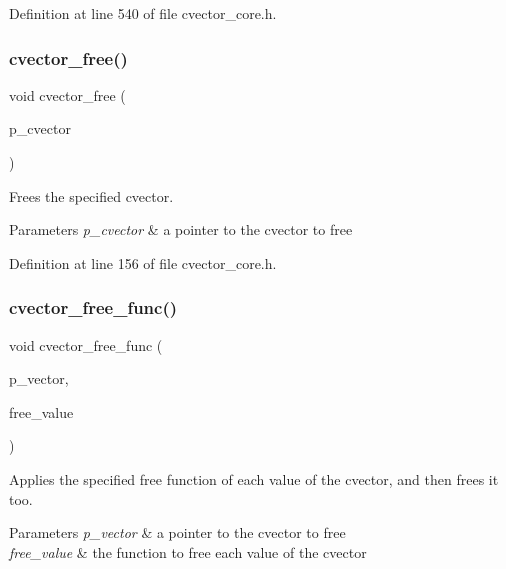 Definition at line 540 of file cvector\+\_\+core.\+h.

\mbox{\label{cvector__core_8h_a91b4f946caa0193dceb9afec7f54e7ff}} 
\subsubsection{cvector\+\_\+free()}
{\footnotesize\ttfamily void cvector\+\_\+free (\begin{DoxyParamCaption}\item[{\textbf{ cvector} $\ast$}]{p\+\_\+cvector }\end{DoxyParamCaption})}

Frees the specified cvector. 
\begin{DoxyParams}{Parameters}
{\em p\+\_\+cvector} & a pointer to the cvector to free \\
\hline
\end{DoxyParams}


Definition at line 156 of file cvector\+\_\+core.\+h.

\mbox{\label{cvector__core_8h_a7ce27dde556f0de76df7c34a48e517a9}} 
\subsubsection{cvector\+\_\+free\+\_\+func()}
{\footnotesize\ttfamily void cvector\+\_\+free\+\_\+func (\begin{DoxyParamCaption}\item[{\textbf{ cvector} $\ast$}]{p\+\_\+vector,  }\item[{void($\ast$)(\textbf{ value\+\_\+t})}]{free\+\_\+value }\end{DoxyParamCaption})}

Applies the specified free function of each value of the cvector, and then frees it too. 
\begin{DoxyParams}{Parameters}
{\em p\+\_\+vector} & a pointer to the cvector to free \\
\hline
{\em free\+\_\+value} & the function to free each value of the cvector \\
\hline
\end{DoxyParams}


